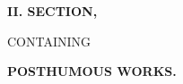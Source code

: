 \documentclass[11pt]{article}
\begin{document}
\thispagestyle{empty}
\vspace*{0.35\textheight}
\begin{center}
{\Large \textbf{II. SECTION,}}\par\vspace{1.2em}
{\large CONTAINING}\par\vspace{1.2em}
{\Large \textbf{POSTHUMOUS WORKS.}}
\end{center}
\end{document}

